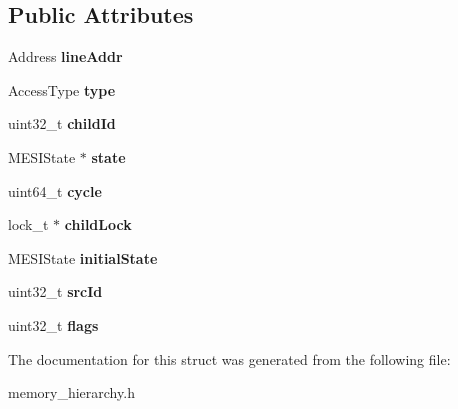 \subsection*{Public Attributes}
\begin{DoxyCompactItemize}
\item 
\hypertarget{structMemReq_aff277d0b461a211c7317a5e6496797a7}{Address {\bfseries line\-Addr}}\label{structMemReq_aff277d0b461a211c7317a5e6496797a7}

\item 
\hypertarget{structMemReq_a8ad0f9d2d8e133320522e33e6456138a}{Access\-Type {\bfseries type}}\label{structMemReq_a8ad0f9d2d8e133320522e33e6456138a}

\item 
\hypertarget{structMemReq_a625f6e100f76719cb76671f9a0da5c75}{uint32\-\_\-t {\bfseries child\-Id}}\label{structMemReq_a625f6e100f76719cb76671f9a0da5c75}

\item 
\hypertarget{structMemReq_a969019d826a2a9c7517da7609ad04ee0}{M\-E\-S\-I\-State $\ast$ {\bfseries state}}\label{structMemReq_a969019d826a2a9c7517da7609ad04ee0}

\item 
\hypertarget{structMemReq_a11a5ceb04211f9e6a1584b0006ef0b53}{uint64\-\_\-t {\bfseries cycle}}\label{structMemReq_a11a5ceb04211f9e6a1584b0006ef0b53}

\item 
\hypertarget{structMemReq_abbc71c1569d783cf7f30f971dad72f9d}{lock\-\_\-t $\ast$ {\bfseries child\-Lock}}\label{structMemReq_abbc71c1569d783cf7f30f971dad72f9d}

\item 
\hypertarget{structMemReq_a346fbfd81deef9b3269aea15d76aa276}{M\-E\-S\-I\-State {\bfseries initial\-State}}\label{structMemReq_a346fbfd81deef9b3269aea15d76aa276}

\item 
\hypertarget{structMemReq_ab1c5db5372b47dd1e44c04e7c31e3adb}{uint32\-\_\-t {\bfseries src\-Id}}\label{structMemReq_ab1c5db5372b47dd1e44c04e7c31e3adb}

\item 
\hypertarget{structMemReq_a2f0374088b59f72c7a3e6ad78209a5e6}{uint32\-\_\-t {\bfseries flags}}\label{structMemReq_a2f0374088b59f72c7a3e6ad78209a5e6}

\end{DoxyCompactItemize}


The documentation for this struct was generated from the following file\-:\begin{DoxyCompactItemize}
\item 
memory\-\_\-hierarchy.\-h\end{DoxyCompactItemize}
